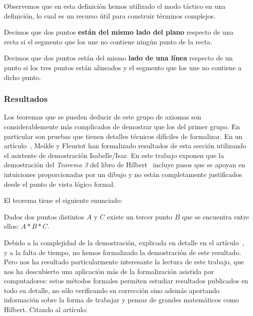 Observemos que en esta definición hemos utilizado el modo táctico en una
definición, lo cual es un recurso útil para construir términos complejos.

\begin{defin*}
	Decimos que dos puntos \textbf{están del mismo lado del plano} respecto de una
	recta si el segmento que los une no contiene ningún punto de la recta.
\end{defin*}


\begin{defin*}
	Decimos que dos puntos están del mismo \textbf{lado de una línea} respecto
	de un punto si los tres puntos están alineados y el segmento que los une no
	contiene a dicho punto.
\end{defin*}


\subsubsection{Resultados}%

Los teoremas que se pueden deducir de este grupo de axiomas son
considerablemente más complicados de demostrar que los del primer grupo. En
particular son pruebas que tienen detalles técnicos difíciles de
formalizar. En un artículo~\cite{meikleFormalizingHilbertGrundlagen2003},
Meikle y Fleuriot han formalizado resultados de esta sección utilizando el
asistente de demostración Isabelle/Isar. En este trabajo exponen que la
demostración del \textit{Teorema 3} del libro de
Hilbert~\cite{hilbertFoundationsGeometry1950} incluye pasos que se apoyan en
intuiciones proporcionadas por un dibujo y no están completamente justificados
desde el punto de vista lógico formal.

El teorema tiene el siguiente enunciado:

\setcounter{tma}{2}
\begin{tma}
	Dados dos puntos distintos $A$ y $C$ existe un tercer punto $B$ que se
	encuentra entre ellos: $A * B * C$.
\end{tma}


Debido a la complejidad de la demostración, explicada en detalle en el
artículo~\cite{meikleFormalizingHilbertGrundlagen2003}, y a la falta de tiempo,
no hemos formalizado la demostración de este resultado. Pero nos ha resultado
particularmente interesante la lectura de este trabajo, que nos ha descubierto
una aplicación más de la formalización asistida por computadores: estos métodos
formales permiten estudiar resultados publicados en todo su detalle,
no sólo verificando su corrección sino además aportando información sobre la
forma de trabajar y pensar de grandes matemáticos como Hilbert. Citando al
artículo:


